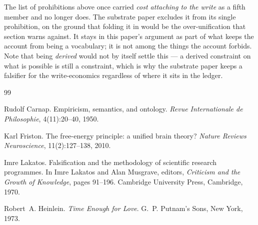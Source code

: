 \documentclass[11pt,a4paper]{article}
\theoremstyle{remark}\newtheorem{remark}[definition]{Remark}
\begin{document}
\noindent The list of prohibitions above once carried \emph{cost attaching to the write} as a fifth
member and no longer does. The substrate paper excludes it from its single prohibition, on the ground
that folding it in would be the over-unification that section warns against. It stays in this paper's
argument as part of what keeps the account from being a vocabulary; it is not among the things the
account forbids. Note that being \emph{derived} would not by itself settle this --- a derived
constraint on what is possible is still a constraint, which is why the substrate paper keeps a
falsifier for the write-economics regardless of where it sits in the ledger.

\begin{thebibliography}{99}
\itemsep=2pt

Rudolf Carnap.
\newblock Empiricism, semantics, and ontology.
\newblock \emph{Revue Internationale de Philosophie}, 4(11):20--40, 1950.

Karl Friston.
\newblock The free-energy principle: a unified brain theory?
\newblock \emph{Nature Reviews Neuroscience}, 11(2):127--138, 2010.

Imre Lakatos.
\newblock Falsification and the methodology of scientific research programmes.
\newblock In Imre Lakatos and Alan Musgrave, editors, \emph{Criticism and the Growth of Knowledge}, pages 91--196. Cambridge University Press, Cambridge, 1970.

Robert~A. Heinlein.
\newblock \emph{Time Enough for Love}.
\newblock G.~P. Putnam's Sons, New York, 1973.

\end{thebibliography}
\end{document}
